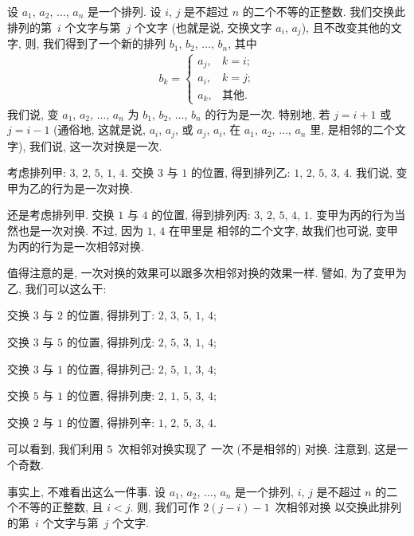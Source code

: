 \documentclass[%
    UTF8,%
    fontset=none,%
    punct=kaiming,%
    zihao=-4,%
    a4paper,%
    oneside,%
]{ctexbook}
\let\emph\relax
\begin{document}
\begin{definition}[对换]
    设 \(a_1\), \(a_2\), \(\dots\), \(a_n\) 是一个排列.
    设 \(i\), \(j\) 是不超过 \(n\) 的二个不等的正整数.
    我们交换此排列的第~\(i\) 个文字与第~\(j\) 个文字
    (也就是说, 交换文字 \(a_i\), \(a_j\)),
    且不改变其他的文字,
    则, 我们得到了一个新的排列
    \(b_1\), \(b_2\), \(\dots\), \(b_n\),
    其中
    \begin{align*}
        b_k
        = \begin{cases}
              a_j, & k = i;     \\
              a_i, & k = j;     \\
              a_k, & \text{其他}.
          \end{cases}
    \end{align*}
    我们说, 变 \(a_1\), \(a_2\), \(\dots\), \(a_n\)
    为 \(b_1\), \(b_2\), \(\dots\), \(b_n\)
    的行为是一次\emph{对换}.
    特别地, 若 \(j = i + 1\) 或
    \(j = i - 1\)
    (通俗地, 这就是说,
    \(a_i\), \(a_j\), 或 \(a_j\), \(a_i\), 在
    \(a_1\), \(a_2\), \(\dots\), \(a_n\) 里,
    是相邻的二个文字),
    我们说, 这一次对换是一次\emph{相邻对换}.
\end{definition}

\begin{example}
    考虑排列甲: \(3\), \(2\), \(5\), \(1\), \(4\).
    交换 \(3\) 与 \(1\) 的位置,
    得到排列乙: \(1\), \(2\), \(5\), \(3\), \(4\).
    我们说, 变甲为乙的行为是一次对换.

    还是考虑排列甲.
    交换 \(1\) 与 \(4\) 的位置,
    得到排列丙: \(3\), \(2\), \(5\), \(4\), \(1\).
    变甲为丙的行为当然也是一次对换.
    不过, 因为 \(1\), \(4\) 在甲里是%
    相邻的二个文字,
    故我们也可说,
    变甲为丙的行为是一次相邻对换.

    值得注意的是,
    一次对换的效果可以跟多次相邻对换的效果一样.
    譬如, 为了变甲为乙,
    我们可以这么干:

    交换 \(3\) 与 \(2\) 的位置,
    得排列丁: \(2\), \(3\), \(5\), \(1\), \(4\);

    交换 \(3\) 与 \(5\) 的位置,
    得排列戊: \(2\), \(5\), \(3\), \(1\), \(4\);

    交换 \(3\) 与 \(1\) 的位置,
    得排列己: \(2\), \(5\), \(1\), \(3\), \(4\);

    交换 \(5\) 与 \(1\) 的位置,
    得排列庚: \(2\), \(1\), \(5\), \(3\), \(4\);

    交换 \(2\) 与 \(1\) 的位置,
    得排列辛: \(1\), \(2\), \(5\), \(3\), \(4\).

    可以看到,
    我们利用 \(5\)~次相邻对换实现了%
    一次 (不是相邻的) 对换.
    注意到, 这是一个奇数.

    事实上, 不难看出这么一件事.
    设 \(a_1\), \(a_2\), \(\dots\), \(a_n\) 是一个排列,
    \(i\), \(j\) 是不超过 \(n\) 的二个不等的正整数,
    且 \(i < j\).
    则, 我们可作 \(2(j - i) - 1\)~次相邻对换%
    以交换此排列的第~\(i\) 个文字与第~\(j\) 个文字.
\end{example}
\end{document}

